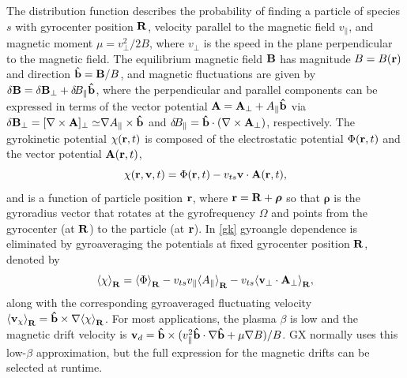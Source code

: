 \documentclass{jpp}
\renewcommand{\vec}[1]{\ensuremath{\mbox{$ {\bf #1} $}}} %
\newcommand{\uv}[1]{\ensuremath{\mathbf{\hat{#1}}}} %
\begin{document}
The distribution function describes the
probability of finding a particle of species $s$ with gyrocenter position ${\bf R}$, velocity parallel to the magnetic
field $v_\parallel$, and magnetic moment $\mu=v_\perp^2/2B$, where
$v_\perp$ is the speed in the plane perpendicular to the magnetic
field. The equilibrium magnetic field ${\bf B}$ has magnitude
$B=B({\bf r})$ and direction $\hat{\bf b} = {\bf B}/B$, and magnetic fluctuations are given by $\delta \vec{B} = \delta \vec{B}_\perp + \delta\!B_\parallel \uv{b}$, where the perpendicular and parallel components can be expressed in terms of the vector potential $\vec{A} = \vec{A}_\perp + A_\parallel \uv{b}$ via $\delta \vec{B}_\perp = {\color{black}  [\nabla \times \vec{A}]_\perp \simeq } \nabla A_\parallel \times \uv{b}$ and $\delta\! B_\parallel = \uv{b}\cdot(\nabla \times \vec{A}_\perp)$, respectively. The gyrokinetic potential $\chi(\vec{r},t)$ is composed of the electrostatic potential $\Phi({\bf r}, t)$ and the vector potential $\vec{A}({\bf r}, t)$,
\begin{equation}
    \chi({\bf r}, \vec{v}, t) = \Phi({\bf r}, t) - v_{ts} \vec{v}\cdot \vec{A}({\bf r}, t),
\end{equation}
and is a function of particle position $\bf r$, where
${\bf r}= {\bf R} + \boldsymbol{\rho}$ so that $\boldsymbol{\rho}$ is
the gyroradius vector that rotates at the gyrofrequency $\Omega$ and
points from the gyrocenter (at $\bf R$) to the particle (at $\bf
r$). In \cref{gk} gyroangle dependence is eliminated by gyroaveraging the potentials at fixed gyrocenter position $\vec{R}$, denoted by
\begin{equation}
    \gyavgR{\chi} = \gyavgR{\Phi} - v_{ts}v_\parallel\gyavgR{A_\parallel} - v_{ts}\gyavgR{\vec{v}_\perp\cdot\vec{A}_\perp},
\end{equation}
along with the corresponding gyroaveraged fluctuating velocity $\gyavgR{\vEM} = \uv{b}\times\nabla \gyavgR{\chi}$. For most applications, the plasma $\beta$ is low and the magnetic
drift velocity is ${\bf v}_d ={\bf \hat{b}}\times(v_\parallel^2 {\bf \hat{b}}\cdot\nabla{\bf \hat{b}} + \mu\nabla B)/B$. GX normally uses this low-$\beta$ approximation, but the full expression for the magnetic drifts can be selected at runtime.
\end{document}
